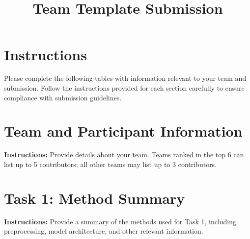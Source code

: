 \documentclass{article}
\title{\textbf{Team Template Submission}}
\date{}
\begin{document}
\maketitle

\section*{Instructions}
Please complete the following tables with information relevant to your team and submission. Follow the instructions provided for each section carefully to ensure compliance with submission guidelines.

\section{Team and Participant Information}
\noindent\textbf{Instructions:} Provide details about your team. Teams ranked in the top 6 can list up to 5 contributors; all other teams may list up to 3 contributors.

\begin{table}[h!]
\centering
{}
\end{table}

\section{Task 1: Method Summary}
\noindent\textbf{Instructions:} Provide a summary of the methods used for Task 1, including preprocessing, model architecture, and other relevant information.

\begin{table}[h!]
\centering
{}
\end{table}
\end{document}
